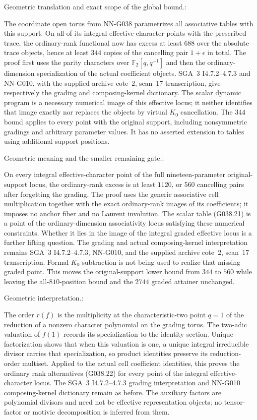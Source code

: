 \begin{geometricstatement}[NN-G038]
Geometric translation and exact scope of the global bound.:

The coordinate open torus from NN-G038 parametrizes all
associative tables with this support. On all of its integral
effective-character points with the prescribed trace, the
ordinary-rank functional now has excess at least $688$
over the absolute trace objects, hence at least $344$
copies of the cancelling pair $1+\epsilon$ in total.
The proof first uses the parity characters over
$\mathbb F_2[q,q^{-1}]$ and then the ordinary-dimension
specialization of the actual coefficient objects. SGA~3
I4.7.2--4.7.3 and NN-G010, with the supplied archive cote~2,
scan~17 transcription, give respectively the grading and
composing-kernel dictionary. The scalar dynamic program
is a necessary numerical image of this effective locus;
it neither identifies that image exactly nor replaces the
objects by virtual $K_0$ cancellation. The $344$ bound applies
to every point with the original support, including nonsymmetric
gradings and arbitrary parameter values. It has no asserted
extension to tables using additional support positions.


Geometric meaning and the smaller remaining gate.:

On every integral effective-character point of the full
nineteen-parameter original-support locus, the ordinary-rank
excess is at least $1120$, or $560$ cancelling pairs after
forgetting the grading. The proof uses the generic associative
cell multiplication together with the exact ordinary-rank
images of its coefficients; it imposes no anchor fiber and
no Laurent involution. The scalar table (G038.21) is a point
of the ordinary-dimension associativity locus satisfying these
numerical constraints. Whether it lies in the image of the
integral graded effective locus is a further lifting question.
The grading and actual composing-kernel interpretation remains
SGA~3 I4.7.2--4.7.3, NN-G010, and the supplied archive cote~2,
scan~17 transcription. Formal $K_0$ subtraction is not being
used to realize that missing graded point. This moves the
original-support lower bound from $344$ to $560$ while leaving
the all-$810$-position bound and the $2744$ graded attainer unchanged.


Geometric interpretation.:

The order $r(f)$ is the multiplicity at the characteristic-two
point $q=1$ of the reduction of a nonzero character polynomial
on the grading torus. The two-adic valuation of $f(1)$ records
its specialization to the identity section. Unique factorization
shows that when this valuation is one, a unique integral
irreducible divisor carries that specialization, so product
identities preserve its reduction-order multiset. Applied to
the actual cell coefficient identities, this proves the ordinary
rank alternatives (G038.22) for every point of the integral
effective-character locus. The SGA~3 I4.7.2--4.7.3 grading
interpretation and NN-G010 composing-kernel dictionary remain
as before. The auxiliary factors are polynomial divisors and
need not be effective representation objects; no tensor-factor
or motivic decomposition is inferred from them.



\end{geometricstatement}
